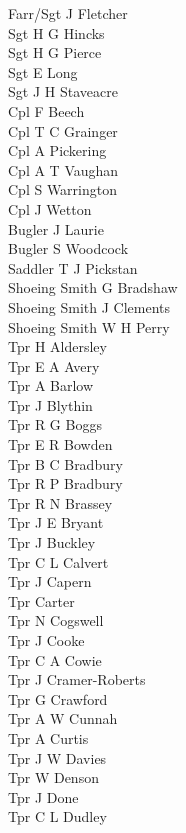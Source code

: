 \begin{multicols}{2}
  \noindent
  Farr/Sgt J Fletcher \\
  Sgt H G Hincks \\
  Sgt H G Pierce \\
  Sgt E Long \\
  Sgt J H Staveacre \\
  Cpl F Beech \\
  Cpl T C Grainger \\
  Cpl A Pickering \\
  Cpl A T Vaughan \\
  Cpl S Warrington \\
  Cpl J Wetton \\
  Bugler J Laurie \\
  Bugler S Woodcock \\
  Saddler T J Pickstan \\
  Shoeing Smith G Bradshaw \\
  Shoeing Smith J Clements \\
  Shoeing Smith W H Perry \\
  Tpr H Aldersley \\
  Tpr E A Avery \\
  Tpr A Barlow \\
  Tpr J Blythin \\
  Tpr R G Boggs \\
  Tpr E R Bowden \\
  Tpr B C Bradbury \\
  Tpr R P Bradbury \\
  Tpr R N Brassey \\
  Tpr J E Bryant \\
  Tpr J Buckley \\
  Tpr C L Calvert \\
  Tpr J Capern \\
  Tpr Carter \\
  Tpr N Cogswell \\
  Tpr J Cooke \\
  Tpr C A Cowie \\
  Tpr J Cramer-Roberts \\
  Tpr G Crawford \\
  Tpr A W Cunnah \\
  Tpr A Curtis \\
  Tpr J W Davies \\
  Tpr W Denson \\
  Tpr J Done \\
  Tpr C L Dudley \\

\end{multicols}
